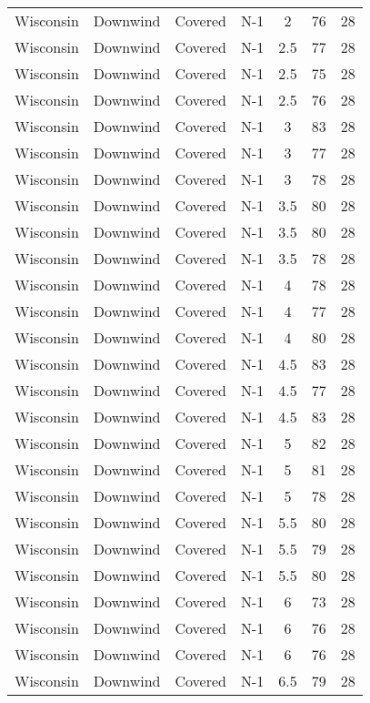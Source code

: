 \documentclass{article}
\begin{document}
\begin{longtable}[H]{ccccccc}
Wisconsin & Downwind & Covered     & N-1 & 2    & 76  & 28 \\
Wisconsin & Downwind & Covered     & N-1 & 2.5  & 77  & 28 \\
Wisconsin & Downwind & Covered     & N-1 & 2.5  & 75  & 28 \\
Wisconsin & Downwind & Covered     & N-1 & 2.5  & 76  & 28 \\
Wisconsin & Downwind & Covered     & N-1 & 3    & 83  & 28 \\
Wisconsin & Downwind & Covered     & N-1 & 3    & 77  & 28 \\
Wisconsin & Downwind & Covered     & N-1 & 3    & 78  & 28 \\
Wisconsin & Downwind & Covered     & N-1 & 3.5  & 80  & 28 \\
Wisconsin & Downwind & Covered     & N-1 & 3.5  & 80  & 28 \\
Wisconsin & Downwind & Covered     & N-1 & 3.5  & 78  & 28 \\
Wisconsin & Downwind & Covered     & N-1 & 4    & 78  & 28 \\
Wisconsin & Downwind & Covered     & N-1 & 4    & 77  & 28 \\
Wisconsin & Downwind & Covered     & N-1 & 4    & 80  & 28 \\
Wisconsin & Downwind & Covered     & N-1 & 4.5  & 83  & 28 \\
Wisconsin & Downwind & Covered     & N-1 & 4.5  & 77  & 28 \\
Wisconsin & Downwind & Covered     & N-1 & 4.5  & 83  & 28 \\
Wisconsin & Downwind & Covered     & N-1 & 5    & 82  & 28 \\
Wisconsin & Downwind & Covered     & N-1 & 5    & 81  & 28 \\
Wisconsin & Downwind & Covered     & N-1 & 5    & 78  & 28 \\
Wisconsin & Downwind & Covered     & N-1 & 5.5  & 80  & 28 \\
Wisconsin & Downwind & Covered     & N-1 & 5.5  & 79  & 28 \\
Wisconsin & Downwind & Covered     & N-1 & 5.5  & 80  & 28 \\
Wisconsin & Downwind & Covered     & N-1 & 6    & 73  & 28 \\
Wisconsin & Downwind & Covered     & N-1 & 6    & 76  & 28 \\
Wisconsin & Downwind & Covered     & N-1 & 6    & 76  & 28 \\
Wisconsin & Downwind & Covered     & N-1 & 6.5  & 79  & 28 \\

\end{longtable}
\end{document}
